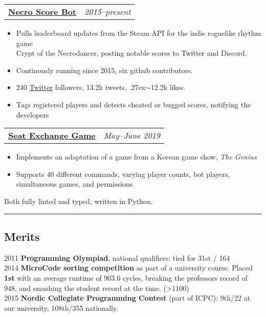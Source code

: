 \documentclass[10pt,letterpaper]{article}
\makeatletter
\newcommand{\headerrow}[2]
{\begin{tabular*}{\linewidth}{l@{\extracolsep{\fill}}r}
    #1 &
    #2 \\
\end{tabular*}}
\makeatother
\begin{document}
\headerrow
{\href{https://github.com/jakkdl/necro\_score\_bot}{\textbf{Necro Score Bot}}}
{\emph{2015--present}}
\begin{itemize}[noitemsep, topsep=1pt]
    \item Pulls leaderboard updates from the Steam API for the indie roguelike
        rhythm game \\ Crypt of the Necrodancer, posting notable scores
        to Twitter and Discord.
    \item Continously running since 2015, six github contributors.
    \item 240 \href{(https://twitter.com/necro\_score\_bot}{Twitter} followers, 13.2k tweets, {\raise.27ex\hbox{$\scriptstyle\sim$}}12.2k likes.
    \item Tags registered players and detects cheated or bugged scores, notifying the
        developers
\end{itemize}
\vspace{0.3em}
\headerrow
    {\href{https://github.com/jakkdl/seat\_exchange}{\textbf{Seat Exchange Game}}}
    {\emph{May--June 2019}}
\begin{itemize}[noitemsep, topsep=1pt]
    \item Implements an adaptation of a game from a Korean game show, \emph{The
        Genius}
    \item Supports 40 different commands, varying player counts,
        bot players, simultaneous games, and permissions
\end{itemize}
\vspace{0.2em}
Both fully linted and typed, written in Python. \\


\hrule
\vspace{-0.4em}
\subsection*{Merits}

2011 \textbf{Programming Olympiad}, national qualifiers: tied for 31st / 164 \\
2014 \textbf{MicroCode sorting competition} as part of a university course. Placed \textbf{1st} with an average runtime of 903.6 cycles, breaking the professors record of 948, and smashing the student record at the time. (>1100) \\
2015 \textbf{Nordic Collegiate Programming Contest} (part of ICPC): 9th/22 at our university, 108th/355 nationally.
\vspace{0.5em}
\end{document}
